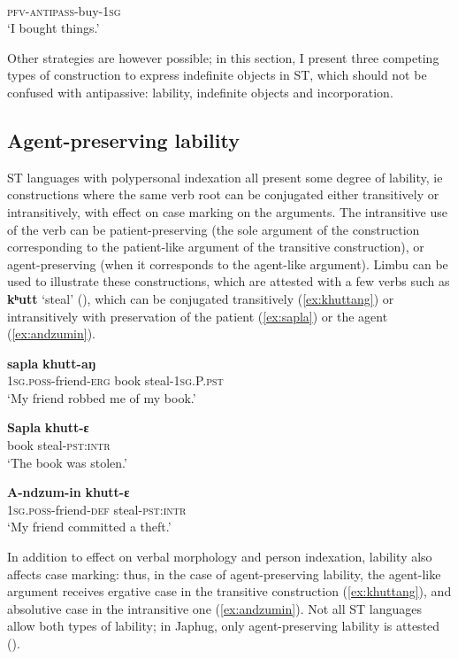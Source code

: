 \documentclass[oneside,a4paper,11pt]{article}
\newcommand{\ipa}[1]{{\phon\textbf{#1}}}
\begin{document}
\begin{exe}
\ex \label{ex:tAraχtWa}
\gll \ipa{tɤ-ra-χtɯ-a} \\
\textsc{pfv}-\textsc{antipass}-buy-\textsc{1sg} \\
\glt `I bought things.'
\end{exe}

Other strategies are however possible; in this section, I present three competing types of construction to express indefinite objects in ST, which should not be confused with antipassive: lability, indefinite objects and incorporation.  

\subsection{Agent-preserving lability} \label{sec:labile}
ST languages with polypersonal indexation all present some degree of lability, ie constructions where the same verb root can be conjugated either transitively or intransitively, with effect on case marking on the arguments. The intransitive use of the verb can be patient-preserving (the sole argument of the construction corresponding to the patient-like argument of the transitive construction), or agent-preserving (when it corresponds to the agent-like argument).  Limbu can be used to illustrate these constructions, which are attested with a few verbs such as  \ipa{kʰutt} `steal' (\citealt[527]{driem91tangut}), which can be conjugated transitively (\ref{ex:khuttang}) or intransitively with preservation of the patient (\ref{ex:sapla}) or the agent (\ref{ex:andzumin}).

\begin{exe}
\ex \label{ex:khuttang}
\gll \ipa{A-ndzum-ille}	\ipa{sapla}	\ipa{khutt-aŋ} \\
\textsc{1sg.poss}-friend-\textsc{erg} book steal-\textsc{1sg.P.pst} \\
\glt `My friend robbed me of my book.'
\end{exe}

\begin{exe}
\ex \label{ex:sapla}
\gll 
\ipa{Sapla}	\ipa{khutt-ɛ} \\
book steal-\textsc{pst:intr} \\
\glt `The book was stolen.'
\end{exe}

\begin{exe}
\ex \label{ex:andzumin}
\gll 
\ipa{A-ndzum-in}	\ipa{khutt-ɛ} \\
\textsc{1sg.poss}-friend-\textsc{def} steal-\textsc{pst:intr} \\
\glt `My friend committed a theft.'
\end{exe}
In addition to effect on verbal morphology and person indexation, lability also affects case marking: thus, in the case of agent-preserving lability, the agent-like argument receives ergative case in the transitive construction (\ref{ex:khuttang}), and absolutive case in the intransitive one (\ref{ex:andzumin}). Not all ST languages allow both types of lability; in Japhug, only agent-preserving lability is attested (\citealt[218]{jacques12demotion}).
\end{document}
